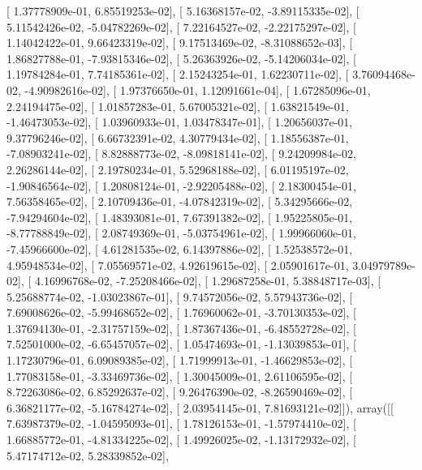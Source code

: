 \documentclass{article}
\begin{document}
       [  1.37778909e-01,   6.85519253e-02],
       [  5.16368157e-02,  -3.89115335e-02],
       [  5.11542426e-02,  -5.04782269e-02],
       [  7.22164527e-02,  -2.22175297e-02],
       [  1.14042422e-01,   9.66423319e-02],
       [  9.17513469e-02,  -8.31088652e-03],
       [  1.86827788e-01,  -7.93815346e-02],
       [  5.26363926e-02,  -5.14206034e-02],
       [  1.19784284e-01,   7.74185361e-02],
       [  2.15243254e-01,   1.62230711e-02],
       [  3.76094468e-02,  -4.90982616e-02],
       [  1.97376650e-01,   1.12091661e-04],
       [  1.67285096e-01,   2.24194475e-02],
       [  1.01857283e-01,   5.67005321e-02],
       [  1.63821549e-01,  -1.46473053e-02],
       [  1.03960933e-01,   1.03478347e-01],
       [  1.20656037e-01,   9.37796246e-02],
       [  6.66732391e-02,   4.30779434e-02],
       [  1.18556387e-01,  -7.08903241e-02],
       [  8.82888773e-02,  -8.09818141e-02],
       [  9.24209984e-02,   2.26286144e-02],
       [  2.19780234e-01,   5.52968188e-02],
       [  6.01195197e-02,  -1.90846564e-02],
       [  1.20808124e-01,  -2.92205488e-02],
       [  2.18300454e-01,   7.56358465e-02],
       [  2.10709436e-01,  -4.07842319e-02],
       [  5.34295666e-02,  -7.94294604e-02],
       [  1.48393081e-01,   7.67391382e-02],
       [  1.95225805e-01,  -8.77788849e-02],
       [  2.08749369e-01,  -5.03754961e-02],
       [  1.99966060e-01,  -7.45966600e-02],
       [  4.61281535e-02,   6.14397886e-02],
       [  1.52538572e-01,   4.95948534e-02],
       [  7.05569571e-02,   4.92619615e-02],
       [  2.05901617e-01,   3.04979789e-02],
       [  4.16996768e-02,  -7.25208466e-02],
       [  1.29687258e-01,   5.38848717e-03],
       [  5.25688774e-02,  -1.03023867e-01],
       [  9.74572056e-02,   5.57943736e-02],
       [  7.69008626e-02,  -5.99468652e-02],
       [  1.76960062e-01,  -3.70130353e-02],
       [  1.37694130e-01,  -2.31757159e-02],
       [  1.87367436e-01,  -6.48552728e-02],
       [  7.52501000e-02,  -6.65457057e-02],
       [  1.05474693e-01,  -1.13039853e-01],
       [  1.17230796e-01,   6.09089385e-02],
       [  1.71999913e-01,  -1.46629853e-02],
       [  1.77083158e-01,  -3.33469736e-02],
       [  1.30045009e-01,   2.61106595e-02],
       [  8.72263086e-02,   6.85292637e-02],
       [  9.26476390e-02,  -8.26590469e-02],
       [  6.36821177e-02,  -5.16784274e-02],
       [  2.03954145e-01,   7.81693121e-02]]), array([[  7.63987379e-02,  -1.04595093e-01],
       [  1.78126153e-01,  -1.57974410e-02],
       [  1.66885772e-01,  -4.81334225e-02],
       [  1.49926025e-02,  -1.13172932e-02],
       [  5.47174712e-02,   5.28339852e-02],
\end{document}
